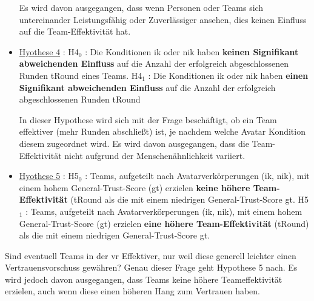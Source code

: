 \documentclass[a4paper,11pt]{article}%
\renewcommand{\\}{\vspace*{0.5\baselineskip} \newline}
\begin{document}
\begin{itemize}
Es wird davon ausgegangen, dass wenn Personen oder Teams sich untereinander Leistungsfähig oder Zuverlässiger ansehen, dies keinen Einfluss auf die Team-Effektivität hat. 
	
	\item{\underline{Hyothese 4} :\\ 
	H4$_{0}$ : Die Konditionen \ac{ik} oder \ac{nik} haben \textbf{keinen Signifikant abweichenden Einfluss} auf die Anzahl der erfolgreich abgeschlossenen Runden \ac{tRound} eines Teams.\newline
	H4$_{1}$ : Die Konditionen \ac{ik} oder \ac{nik} haben \textbf{einen Signifikant abweichenden Einfluss} auf die Anzahl der erfolgreich abgeschlossenen Runden \ac{tRound}}
	
	
In dieser Hypothese wird sich mit der Frage beschäftigt, ob ein Team effektiver (mehr Runden abschließt) ist, je nachdem welche Avatar Kondition diesem zugeordnet wird. Es wird davon ausgegangen, dass die Team-Effektivität nicht aufgrund der Menschenähnlichkeit variiert.

	\item{\underline{Hyothese 5} :\\ 
	H5$_{0}$ : Teams, aufgeteilt nach Avatarverkörperungen (\ac{ik}, \ac{nik}), mit einem hohem General-Trust-Score (\ac{gt}) erzielen \textbf{keine höhere Team-Effektivität} (\ac{tRound} als die mit einem niedrigen General-Trust-Score \ac{gt}. \newline
	H5$_{1}$ :  Teams, aufgeteilt nach Avatarverkörperungen (\ac{ik}, \ac{nik}), mit einem hohem General-Trust-Score (\ac{gt}) erzielen \textbf{eine höhere Team-Effektivität} (\ac{tRound}) als die mit einem niedrigen General-Trust-Score \ac{gt}}.
\end{itemize}

Sind eventuell Teams in der \ac{vr} Effektiver, nur weil diese generell leichter einen Vertrauensvorschuss gewähren? Genau dieser Frage geht Hypothese 5 nach. Es wird jedoch davon ausgegangen, dass Teams keine höhere Teameffektivität erzielen, auch wenn diese einen höheren Hang zum Vertrauen haben.
\end{document}
